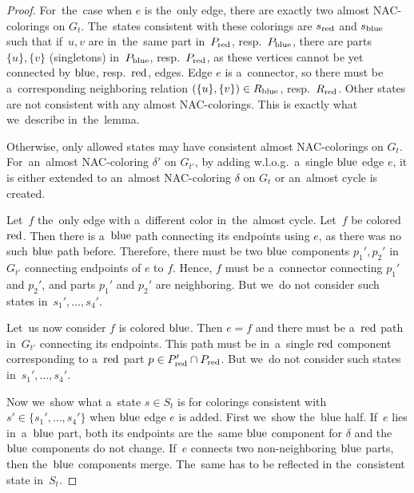 \begin{proof}
	For~the~case when \( e \) is the~only edge,
	there are exactly two almost NAC-colorings on \( G_t \).
	The~states consistent with these colorings are \( s_{\text{red}} \) and \( s_{\text{blue}} \)
	such that if~\( u, v \) are in~the~same part in~\( P_{\text{red}} \), resp.\ \( P_{\text{blue}} \),
	there are parts \( \{u\}, \{v\} \) (singletons) in~\( P_{\text{blue}} \), resp.\ \( P_{\text{red}} \),
	as these vertices cannot be yet connected by \( \text{blue} \), resp.\ \( \text{red} \), edges.
	Edge \( e \) is a~connector, so there must be a~corresponding neighboring
	relation \( (\{u\}, \{v\}) \in R_{\text{blue}} \), resp.\ \( R_{\text{red}} \).
	Other states are not consistent with any almost NAC-colorings.
	This is exactly what we~describe in~the~lemma.

	Otherwise, only allowed states may have consistent almost NAC-colorings on \( G_t \).
	For~an~almost NAC-coloring \( \delta' \) on \( G_{t'} \),
	by adding w.l.o.g.\ a~single \( \text{blue} \) edge \( e \),
	it is either extended to an~almost NAC-coloring \( \delta \) on \( G_t \)
	or an~almost cycle is created.

	Let~\( f \) the~only edge with a~different color in~the~almost cycle.
	Let~\( f \) be colored \( \text{red} \).
	Then there is a~\( \text{blue} \) path connecting its endpoints using \( e \),
	as there was no such \( \text{blue} \) path before.
	Therefore, there must be two \( \text{blue} \) components \( p_1', p_2' \) in~\( G_{t'} \)
	connecting endpoints of \( e \) to \( f \).
	Hence, \( f \) must be a~connector connecting \( p_1' \) and \( p_2' \),
	and parts \( p_1' \) and \( p_2' \) are neighboring.
	But we~do not consider such states in~\( s_1', \dots, s_4' \).

	Let~us now consider \( f \) is colored \( \text{blue} \).
	Then \( e = f \) and
	there must be a~\( \text{red} \) path in~\( G_{t'} \) connecting its endpoints.
	This path must be in~a~single \( \text{red} \) component corresponding
	to a~\( \text{red} \) part \( p \in P_{\text{red}}' \cap P_{\text{red}} \).
	But we~do not consider such states in~\( s_1', \dots, s_4' \).

	Now we~show what a~state \( s \in S_t \) is
	for colorings consistent with \( s' \in \{s_1', \dots, s_4'\} \)
	when \( \text{blue} \) edge \( e \) is added.
	First we~show the~blue half.
	If~\( e \) lies in~a~\( \text{blue} \) part,
	both its endpoints are the~same \( \text{blue} \) component
	for \( \delta \) and the~\( \text{blue} \) components do not change.
	If~\( e \) connects two non-neighboring \( \text{blue} \) parts,
	then the~\( \text{blue} \) components merge. The~same has to be reflected in
	the~consistent state in~\( S_t \).


\end{proof}

